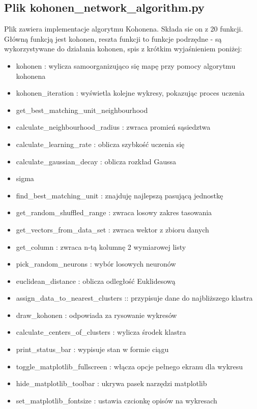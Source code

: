 \documentclass{classrep}
\begin{document}
{	\subsection{Plik  kohonen\_network\_algorithm.py}
	{
		Plik zawiera implementacje algorytmu Kohonena. Składa sie on z 20 funkcji. Główną funkcją jest kohonen, reszta funkcji to funkcje podrzędne - są wykorzystywane do działania kohonen, spis z krótkim wyjaśnieniem poniżej: 
\begin{itemize}
\item kohonen : wylicza samoorganizująco się mapę przy pomocy algorytmu kohonena
\item kohonen\_iteration : wyświetla kolejne wykresy, pokazując proces uczenia
\item get\_best\_matching\_unit\_neighbourhood
\item calculate\_neighbourhood\_radius : zwraca promień sąsiedztwa
\item calculate\_learning\_rate : oblicza szybkość uczenia się
\item calculate\_gaussian\_decay : oblicza rozkład Gaussa
\item sigma
\item find\_best\_matching\_unit : znajduję najlepszą pasującą jednostkę
\item get\_random\_shuffled\_range : zwraca losowy zakres tasowania
\item get\_vectors\_from\_data\_set : zwraca wektor z zbioru danych
\item get\_column : zwraca n-tą kolumnę 2 wymiarowej listy
\item pick\_random\_neurons : wybór losowych neuronów
\item euclidean\_distance : oblicza odległość Euklidesową
\item assign\_data\_to\_nearest\_clusters :: przypisuje dane do najbliższego klastra
\item draw\_kohonen : odpowiada za rysowanie wykresów
\item calculate\_centers\_of\_clusters : wylicza środek klastra
\item print\_status\_bar : wypisuje stan w formie ciągu
\item toggle\_matplotlib\_fullscreen : włącza opcje pełnego ekranu dla wykresu
\item hide\_matplotlib\_toolbar : ukrywa pasek narzędzi matplotlib
\item set\_matplotlib\_fontsize : ustawia czcionkę opisów na wykresach
\end{itemize}
	}
	
}
\end{document}
